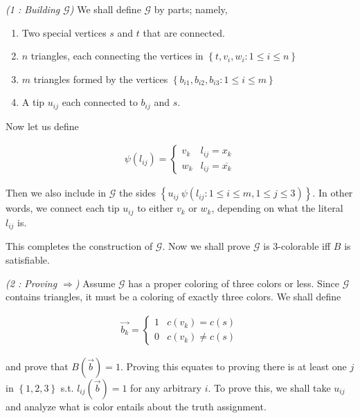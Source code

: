 \documentclass[a4paper]{article}
\begin{document}
\textit{(1 : Building $\mathcal{G}$)} We shall define $\mathcal{G}$ by parts; namely, 

\begin{enumerate}
    \item Two special vertices $s$ and $t$ that are connected.
    \item $n$ triangles, each connecting the vertices in $\left\{ t, v_{i}, w_{i} : 1 \leq i \leq n \right\} $
    \item $m$ triangles formed by the vertices $\left\{ b_{i1}, b_{i2}, b_{i3} : 1 \leq i \leq m \right\} $
    \item A tip $u_{ij}$ each connected to $b_{ij}$ and $s$.
\end{enumerate}

Now let us define 

\begin{align*}
    \psi(l_{ij}) = \begin{cases}
        v_{k} & l_{ij} = x_k  \\ 
        w_{k} & l_{ij} = \overline{x_k}
    \end{cases}
\end{align*}

Then we also include in $\mathcal{G}$ the sides $\left\{ u_{ij} ~ \psi(l_{ij} :
1 \leq i \leq m, 1 \leq j \leq 3) \right\} $. In other words, we connect each
tip $u_{ij}$ to either $v_k$ or $w_k$, depending on what the literal $l_{ij}$
is.

This completes the construction of $\mathcal{G}$. Now we shall prove 
$\mathcal{G}$ is 3-colorable iff $B$ is satisfiable.

\textit{(2 : Proving $\Rightarrow$)} Assume $\mathcal{G}$ has a proper coloring
of three colors or less. Since $\mathcal{G}$ contains triangles,
it must be a coloring of exactly three colors. We shall define 

\begin{align*}
    \overrightarrow{b_k} = \begin{cases}
        1 & c(v_k) = c(s) \\ 
        0 & c(v_k) \neq c(s)
    \end{cases}
\end{align*}

and prove that $B(\overrightarrow{b}) = 1$. Proving this equates to proving
there is at least one $j$ in $\left\{ 1, 2, 3 \right\} $ s.t.
$l_{ij}(\overrightarrow{b}) = 1$ for any arbitrary $i$. To prove this, we shall
take $u_{ij}$ and analyze what is color entails about the truth assignment.
\end{document}
